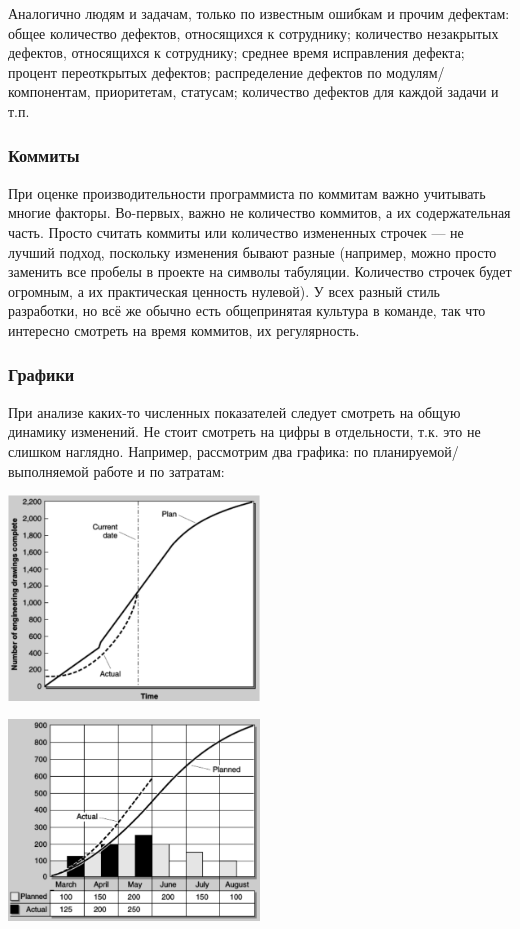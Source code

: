 \documentclass{../../text-style}
\begin{document}
Аналогично людям и задачам, только по известным ошибкам и прочим дефектам: общее количество дефектов, относящихся к сотруднику; количество незакрытых дефектов, относящихся к сотруднику; среднее время исправления дефекта; процент переоткрытых дефектов; распределение дефектов по модулям/компонентам, приоритетам, статусам; количество дефектов для каждой задачи  и т.п.

\subsubsection{Коммиты}

При оценке производительности программиста по коммитам важно учитывать многие факторы. Во-первых, важно не количество коммитов, а их содержательная часть. Просто считать коммиты или количество измененных строчек --- не лучший подход, поскольку изменения бывают разные (например, можно просто заменить все пробелы в проекте на символы табуляции. Количество строчек будет огромным, а их практическая ценность нулевой). У всех разный стиль разработки, но всё же обычно есть общепринятая культура в команде, так что интересно смотреть на время коммитов, их регулярность.

\subsubsection{Графики}

При анализе каких-то численных показателей следует смотреть на общую динамику изменений. Не стоит смотреть на цифры в отдельности, т.к. это не слишком наглядно.
Например, рассмотрим два графика: по планируемой/выполняемой работе и по затратам:

\begin{center}
    \includegraphics[width=0.5\textwidth]{plannedWorkGraph.png}
\end{center}

\begin{center}
    \includegraphics[width=0.5\textwidth]{costGraph.png}
\end{center}
\end{document}
